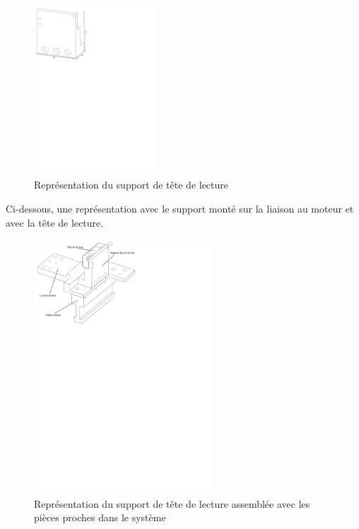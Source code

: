 \begin{figure}[H]
    \centering
    \includegraphics[width = 0.4\textwidth]{assets/figures/SupportTeteLecture.svg}
    \caption{Représentation du support de tête de lecture}
    \label{fig:SupTeteLect}
\end{figure}

Ci-dessous, une représentation avec le support monté sur la liaison au moteur et avec la tête de lecture.

\begin{figure}[H]
    \centering
    \includegraphics[width = 0.6\textwidth]{assets/figures/AssemblageMesureLineaire.svg}
    \caption{Représentation du support de tête de lecture assemblée avec les pièces proches dans le système}
    \label{fig:AssMesLin}
\end{figure}

